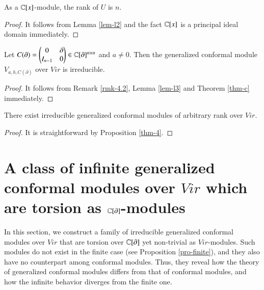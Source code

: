\documentclass[12pt]{amsart}
\begin{document}

\begin{lem}\label{lem-l3} As a $\mathbb{C}[x]$-module, the rank of $U$ is $n$.
\end{lem}
\begin{proof}
It follows from Lemma \ref{lem-l2} and the fact $\mathbb{C}[x]$ is a principal ideal domain immediately.
\end{proof}
\begin{pro}\label{thm-4} Let $C(\partial) =\begin{pmatrix} 0 & \partial  \\  I_{n-1} & 0 \end{pmatrix}\in\mathbb{C}[\partial]^{n\times n}$ and $a\neq 0$. Then the generalized conformal module $V_{a,b,C(\partial)}$ over $Vir$ is irreducible.
\end{pro}
\begin{proof}
It follows from Remark \ref{rmk-4.2}, Lemma \ref{lem-l3} and Theorem \ref{thm-c}  immediately.
\end{proof}

\begin{thm}\label{thm-5}
There exist irreducible generalized conformal modules of arbitrary rank over $Vir$.
\end{thm}
\begin{proof}
It is straightforward by Proposition \ref{thm-4}.
\end{proof}
\section{A class of infinite generalized conformal modules over $Vir$ which are torsion as $\mathbb{C}[\partial]$-modules}
In this section, we construct a family of irreducible generalized conformal modules over $Vir$ that are torsion over $\mathbb{C}[\partial]$ yet non-trivial as $Vir$-modules. Such modules do not exist in the finite case (see Proposition \ref{pro-finite}), and they also have no counterpart among conformal modules. Thus, they reveal how the theory of generalized conformal modules differs from that of conformal modules, and how the infinite behavior diverges from the finite one.
\end{document}
